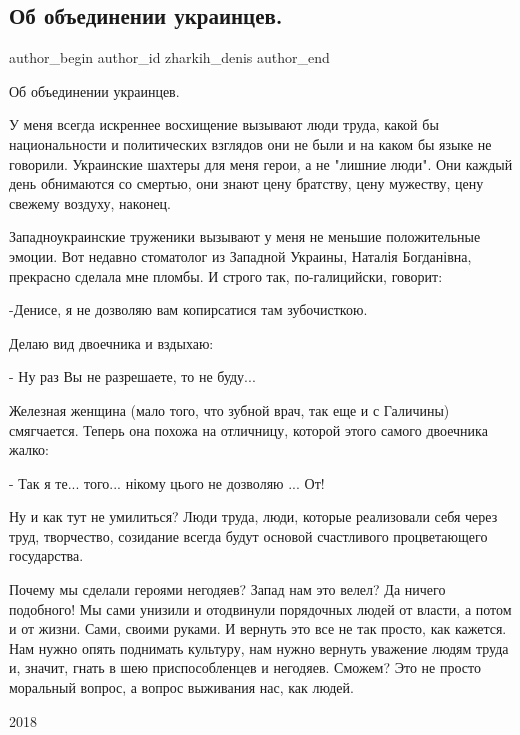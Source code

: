  
 
 
 
 
 
\subsection{Об объединении украинцев.}
\label{sec:20_08_2021.fb.zharkih_denis.1.objedinenie}
 
\ifcmt
 author_begin
   author_id zharkih_denis
 author_end
\fi

Об объединении украинцев.

У меня всегда искреннее восхищение вызывают люди труда, какой бы национальности
и политических взглядов они не были и на каком бы языке не говорили. Украинские
шахтеры для меня герои, а не "лишние люди". Они каждый день обнимаются со
смертью, они знают цену братству, цену мужеству, цену свежему воздуху, наконец. 

Западноукраинские труженики вызывают у меня не меньшие положительные эмоции.
Вот недавно стоматолог из Западной Украины, Наталія Богданівна, прекрасно
сделала мне пломбы. И строго так, по-галицийски, говорит:

-Денисе, я не дозволяю вам копирсатися там зубочисткою. 

Делаю вид двоечника и вздыхаю:

- Ну раз Вы не разрешаете, то не буду...

Железная женщина (мало того, что зубной врач, так еще и с Галичины) смягчается.
Теперь она похожа на отличницу, которой этого самого двоечника жалко:

- Так я те... того... нікому цього не дозволяю ... От!

Ну и как тут не умилиться? Люди труда, люди, которые реализовали себя через
труд, творчество, созидание всегда будут основой счастливого процветающего
государства.

Почему мы сделали героями негодяев? Запад нам это велел? Да ничего подобного!
Мы сами унизили и отодвинули порядочных людей от власти, а потом и от жизни.
Сами, своими руками. И вернуть это все не так просто, как кажется. Нам нужно
опять поднимать культуру, нам нужно вернуть уважение людям труда и, значит,
гнать в шею приспособленцев и негодяев. Сможем? Это не просто моральный вопрос,
а вопрос выживания нас, как людей.

2018
